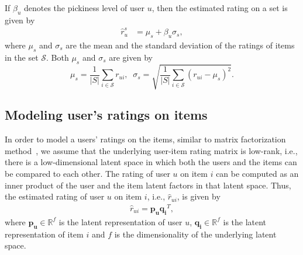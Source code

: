  
If $\beta_u$ denotes the pickiness level of user $u$,
then the estimated rating on a set is given by
\begin{equation} \label{varActEq}
  \begin{split}
    \hat{r}_{u}^s &= \mu_{s} + \beta_u \sigma_{s},
  \end{split}
\end{equation}
\noindent where $\mu_{s}$ and $\sigma_{s}$ are the mean and the standard
deviation of the ratings of items in the set $\mathcal{S}$.  %
Both $\mu_{s}$ and $\sigma_{s}$ are given by 
\begin{equation}
  \mu_{s} = \frac{1}{|S|} \sum_{i \in \mathcal{S}} r_{ui},\;\;  
  \sigma_{s} = \sqrt{\frac{1}{|S|} \sum_{i \in \mathcal{S}} (r_{ui} -\mu_{s})^2}.
\end{equation}

\iffalse
\noindent since we do not know the original ratings of the items in the sets, we
can estimate rating on the set as
\begin{equation} \label{varEstEq}
  \begin{split}
    \hat{r}_{u}^s &= \hat{\mu}_{s} + \beta_u \hat{\sigma}_{s} ,
  \end{split}
\end{equation}
\noindent where $\hat{\mu}_{s}$ is the mean and $\hat{\sigma}_{s}$ is the standard
deviation of the estimated ratings of items in the set $s$.
\fi


\subsection{Modeling user's ratings on items}
In order to model a users' ratings on the items, similar to matrix
factorization method~\cite{koren2009matrix},
we assume that the underlying user-item rating matrix is low-rank, i.e., there is a low-dimensional latent space in which both the users
and the items can be compared to each other. 
The rating of user $u$ on item $i$ can be computed as an inner product of
the user and the item latent factors in that latent space.
Thus, the estimated
rating of user $u$ on item $i$, i.e., $\hat{r}_{ui}$, is given by
\begin{equation} \label{ratPred_eq}
  \begin{split}
    \hat{r}_{ui} = \bm{p_u}\bm{q_i}^T,
  \end{split}
\end{equation}
\noindent where $\bm{p_u} \in \mathbb{R}^f$  is the latent representation of user $u$,
$\bm{q_i} \in \mathbb{R}^f$ is the latent representation of item $i$ and $f$ is the
dimensionality of the underlying latent space.



